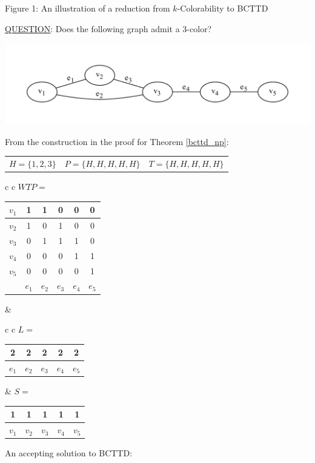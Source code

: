 \documentclass[]{article}
\theoremstyle{definition}
\theoremstyle{remark}
\numberwithin{equation}{section}
\begin{document}
\begin{center}
	Figure 1: An illustration of a reduction from $k$-Colorability to BCTTD
\end{center}
\setcounter{figure}{1}
\underline{QUESTION}: Does the following graph admit a 3-color?
\begin{center}
	\includegraphics[scale=0.75]{3colorinstance}
\end{center}
From the construction in the proof for Theorem \ref{bcttd_np}: \\
\begin{center}
	\begin{tabular}{ l c r }
		$H=\{1,2,3\}$ & $P=\{H,H,H,H,H\}$ & $T=\{H,H,H,H,H\}$
	\end{tabular}
	\begin{tabular}{ c c }
		$WTP=$ \begin{tabular}{ r | c | c | c | c | c }
			$v_1$ & 1 & 1 & 0 & 0 & 0 \\ \hline
			$v_2$ & 1 & 0 & 1 & 0 & 0 \\ \hline
			$v_3$ & 0 & 1 & 1 & 1 & 0 \\ \hline
			$v_4$ & 0 & 0 & 0 & 1 & 1 \\ \hline
			$v_5$ & 0 & 0 & 0 & 0 & 1 \\ \hline
			& $e_1$ & $e_2$ & $e_3$ & $e_4$ & $e_5$
		\end{tabular} & 
		\begin{tabular}{ c c }
			$L=$ \begin{tabular}{ c | c | c | c | c }
				2 & 2 & 2 & 2 & 2 \\ \hline
				$e_1$ & $e_2$ & $e_3$ & $e_4$ & $e_5$
			\end{tabular} & $S=$ \begin{tabular}{ c | c | c | c | c }
			1 & 1 & 1 & 1 & 1 \\ \hline
			$v_1$ & $v_2$ & $v_3$ & $v_4$ & $v_5$
		\end{tabular}
	\end{tabular} 
\end{tabular}
\end{center}
An accepting solution to BCTTD: \\
\end{document}
